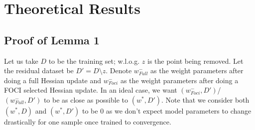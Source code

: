 \section{Theoretical Results}
\subsection{Proof of Lemma 1}
Let us take $D$ to be the training set; w.l.o.g. $z$ is the point being removed. Let the residual dataset be $D' = D \setminus {z}$.
Denote $w^-_{Full}$ as the weight parameters after doing a full Hessian update and $w^-_{Foci}$ as the weight parameters after doing a FOCI selected Hessian update.
In an ideal case, we want $(w^-_{Foci}, D')$/$(w^-_{Full}, D')$ to be as close as possible to $(w^*, D')$. Note that we consider both $(w^*, D)$ and $(w^*, D')$ to be $0$ as we don't expect model parameters to change drastically for one sample once trained to convergence. 

